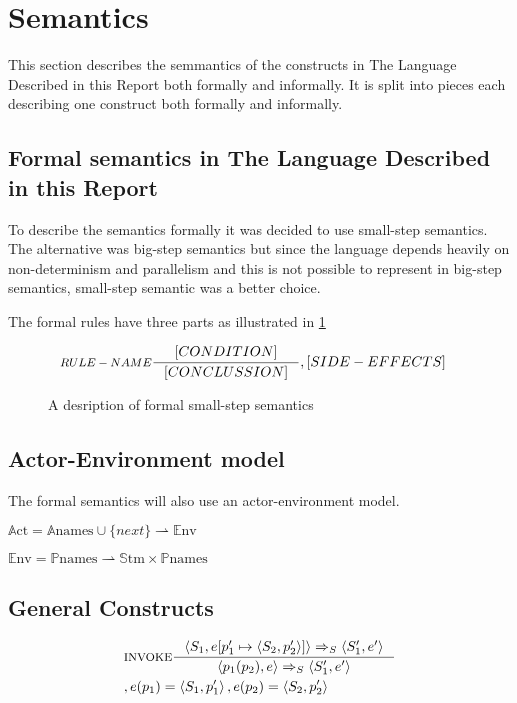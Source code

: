 \section{Semantics}
This section describes the semmantics of the constructs in The Language Described in this Report both formally and informally. It is split into pieces each describing one construct both formally and informally.

\subsection{Formal semantics in The Language Described in this Report}
To describe the semantics formally it was decided to use small-step semantics. The alternative was big-step semantics but since the language depends heavily on non-determinism and parallelism and this is not possible to represent in big-step semantics, small-step semantic was a better choice.

The formal rules have three parts as illustrated in \cref{SS-semantics}

\begin{figure}[H]
\begin{align*}
&\inference[$RULE-NAME$]{[CONDITION]}
												{[CONCLUSSION]}
												{,[SIDE-EFFECTS]}
\end{align*}
\caption{A desription of formal small-step semantics}
\label{SS-semantics}
\end{figure}

\subsection{Actor-Environment model}
The formal semantics will also use an actor-environment model.

$\mathbb{A}\text{ct} = \mathbb{A}\text{names} \cup \{next\} \rightharpoonup \mathbb{E}\text{nv}$

$\mathbb{E}\text{nv} = \mathbb{P}\text{names} \rightharpoonup \mathbb{S}\text{tm} \times \mathbb{P}\text{names}$

\subsection{General Constructs}
\begin{align*}
&\inference[$\text{INVOKE}$]{\Braket{S_1,e[p_1' \mapsto \Braket{S_2,p_2'}]} \Rightarrow_S \Braket{S_1',e'}}
                  {\Braket{p_1(p_2),e} \Rightarrow_S \Braket{S_1',e'}}
\\
&									{,e(p_1) = \Braket{S_1,p_1'}, e(p_2) = \Braket{S_2,p_2'}}
\end{align*}

